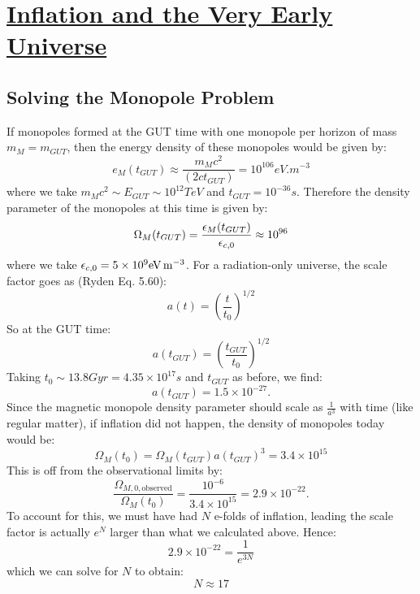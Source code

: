 \section[Inflation and the Very Early Universe]{\hyperlink{toc}{Inflation and the Very Early Universe}}

\subsection{}

\subsection{Solving the Monopole Problem}
If monopoles formed at the GUT time with one monopole per horizon of mass $m_M = m_{GUT}$, then the energy density of these monopoles would be given by:
\begin{equation}
    e_M(t_{GUT}) \approx \frac{m_Mc^2}{(2ct_{GUT})} = 10^{106}\si{eV.m^{-3}}
\end{equation}
where we take $m_Mc^2 \sim E_{GUT} \sim 10^{12}\si{TeV}$ and $t_{GUT} = 10^{-36}\si{s}$. Therefore the density parameter of the monopoles at this time is given by:
\begin{equation}
    \Omega_M(t_{GUT}) = \frac{\e_{M}(t_{GUT})}{\e_{c, 0}} \approx 10^{96}
\end{equation}
where we take $\e_{c, 0} = 5 \times 10^9\si{eV.m^{-3}}$. For a radiation-only universe, the scale factor goes as (Ryden Eq. 5.60):
\begin{equation}
    a(t) = \left(\frac{t}{t_0}\right)^{1/2}
\end{equation}
So at the GUT time:
\begin{equation}
    a(t_{GUT}) = \left(\frac{t_{GUT}}{t_0}\right)^{1/2}
\end{equation}
Taking $t_0 \sim 13.8\si{Gyr} = 4.35 \times 10^{17}\si{s}$ and $t_{GUT}$ as before, we find:
\begin{equation}
    a(t_{GUT}) = 1.5 \times 10^{-27}.
\end{equation}
Since the magnetic monopole density parameter should scale as $\frac{1}{a^3}$ with time (like regular matter), if inflation did not happen, the density of monopoles today would be:
\begin{equation}
    \Omega_M(t_0) = \Omega_M(t_{GUT})a(t_{GUT})^3 = 3.4 \times 10^{15}
\end{equation}
This is off from the observational limits by:
\begin{equation}
    \frac{\Omega_{M, 0, \text{observed}}}{\Omega_M(t_0)} = \frac{10^{-6}}{3.4 \times 10^{15}} = 2.9 \times 10^{-22}.
\end{equation}
To account for this, we must have had $N$ e-folds of inflation, leading the scale factor is actually $e^{N}$ larger than what we calculated above. Hence:
\begin{equation}
    2.9 \times 10^{-22} = \frac{1}{e^{3N}}
\end{equation}
which we can solve for $N$ to obtain:
\begin{equation}
    \boxed{N \approx 17}
\end{equation}


